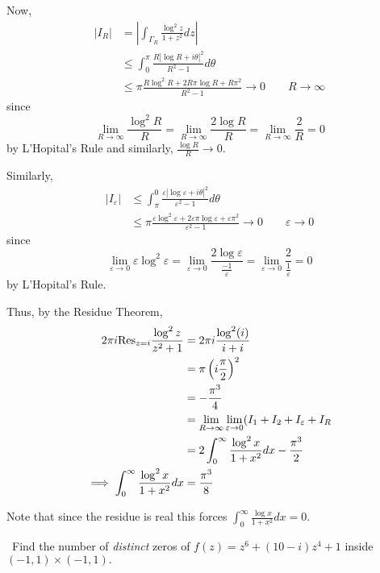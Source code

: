 \documentclass[12pt]{Qual}
\begin{document}
\begin{solution}
Now, \begin{align*}
    |I_R|&=\left|\int_{\Gamma_R}\frac{\log^2 z}{1+z^2}dz\right|\\
    &\le\int_0^\pi\frac{R|\log R+i\theta|^2}{R^2-1}d\theta\\
    &\le \pi\frac{R\log^2 R+2R\pi\log R+R\pi^2}{R^2-1}\to0\qquad R\to\infty
\end{align*}
 since $$\lim_{R\to\infty}\frac{\log^2R}{R}=\lim_{R\to\infty}\frac{2\log R}{R}=\lim_{R\to\infty}\frac{2}{R}=0$$ by L'Hopital's Rule and similarly, $\frac{\log R}{R}\to0$.

 Similarly, \begin{align*}
     |I_\varepsilon|&\le \int_\pi^0\frac{\varepsilon|\log\varepsilon+i\theta|^2}{\varepsilon^2-1}d\theta\\
     &\le \pi\frac{\varepsilon\log^2 \varepsilon+2\varepsilon\pi\log \varepsilon+\varepsilon\pi^2}{\varepsilon^2-1}\to0\qquad \varepsilon\to0
 \end{align*} since $$\lim_{\varepsilon\to0}\varepsilon\log^2\varepsilon=\lim_{\varepsilon\to0}\frac{2\log \varepsilon}{\frac{-1}{\varepsilon}}=\lim_{\varepsilon\to0}\frac{2}{\frac{1}{\varepsilon}}=0$$ by L'Hopital's Rule.

 Thus, by the Residue Theorem, \begin{align*}
     2\pi i\text{Res}_{z=i}\frac{\log^2 z}{z^2+1}&=2\pi i\frac{\log^2(i)}{i+i}\\
     &=\pi\left(i\frac{\pi}{2}\right)^2\\
     &=-\frac{\pi^3}{4}\\
     &=\lim_{R\to\infty}\lim_{\varepsilon\to0}(I_1+I_2+I_\varepsilon+I_R\\
     &=2\int_0^\infty\frac{\log^2 x}{1+x^2}dx-\frac{\pi^3}{2}\\
     \implies \int_0^\infty\frac{\log^2 x}{1+x^2}dx&=\frac{\pi^3}{8}
 \end{align*}

Note that since the residue is real this forces $\displaystyle \int_0^\infty\frac{\log x}{1+x^2}dx=0$.
\end{solution}
\newpage



\begin{problem} $\,$
Find the number of \textit{distinct} zeros of $f(z)=z^6+(10-i)z^4+1$ inside $(-1,1)\times(-1,1).$
\end{problem}
\end{document}
